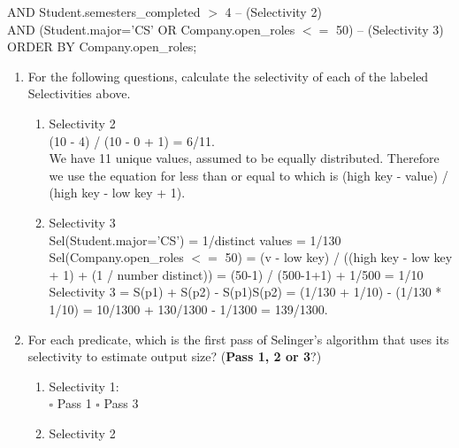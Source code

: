 \documentclass[10pt]{article}
\begin{document}
AND Student.semesters\_completed $>$ 4 \hfill -- (Selectivity 2)\\
AND (Student.major='CS' OR Company.open\_roles $<=$ 50) \hfill -- (Selectivity 3)\\
ORDER BY Company.open\_roles;
\begin{enumerate}
    \item[1.] [4 points] For the following questions, calculate the selectivity of each of the labeled Selectivities above.
    \begin{enumerate}
        \item Selectivity 2 \\ 
        {\color{red}  (10 - 4) / (10 - 0 + 1) = 6/11.\\
        We have 11 unique values, assumed to be equally distributed. Therefore we use the equation for less than or equal to which is (high key - value) / (high key - low key + 1).}
        \item Selectivity 3 \\ 
        {\color{red}
        Sel(Student.major='CS') = 1/distinct values = 1/130\\
        Sel(Company.open\_roles $<=$ 50) = (v - low key) / ((high key - low key + 1) + (1 / number distinct)) = (50-1) / (500-1+1) + 1/500 = 1/10\\
        Selectivity 3 = S(p1) + S(p2) - S(p1)S(p2) = (1/130 + 1/10) - (1/130 * 1/10) = 10/1300 + 130/1300 - 1/1300 = 139/1300. }
    \end{enumerate}
    \item[2.] [6 points]  For each predicate, which is the first pass of Selinger's algorithm that uses its selectivity to estimate output size? (\textbf{Pass 1, 2 or 3}?)
    \begin{enumerate}
        \item Selectivity 1: \\
        $\square$ Pass 1  \quad $\square$ Pass 3
        \item Selectivity 2 \\

\end{enumerate}
\end{enumerate}
\end{document}
